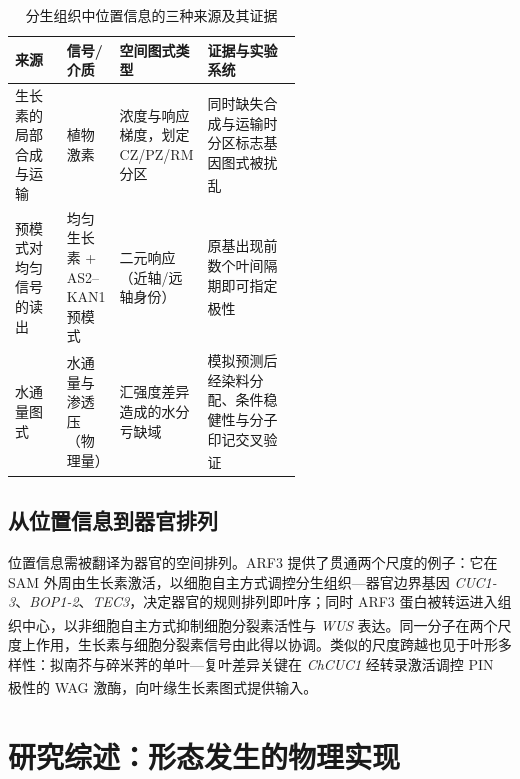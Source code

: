 \documentclass[11pt,a4paper]{ctexart}
\begin{document}
\begin{table}[htbp]
  \centering
  \caption{分生组织中位置信息的三种来源及其证据}
  \label{tab:positional}
  \small
  \renewcommand{\arraystretch}{1.5}
  \setlength{\tabcolsep}{5pt}
  \begin{tabularx}{\linewidth}{@{}>{\raggedright\arraybackslash}p{0.185\linewidth}
                                        >{\raggedright\arraybackslash}p{0.175\linewidth}
                                        >{\raggedright\arraybackslash}p{0.215\linewidth}
                                        >{\raggedright\arraybackslash}X@{}}
    \toprule
    \textbf{来源} & \textbf{信号/介质} & \textbf{空间图式类型} & \textbf{证据与实验系统} \\
    \midrule
    生长素的局部合成与运输 & 植物激素 & 浓度与响应梯度，划定 CZ/PZ/RM 分区
      & 同时缺失合成与运输时分区标志基因图式被扰乱\textsuperscript{\cite{ref2}} \\
    预模式对均匀信号的读出 & 均匀生长素 + AS2--KAN1 预模式 & 二元响应（近轴/远轴身份）
      & 原基出现前数个叶间隔期即可指定极性\textsuperscript{\cite{ref10}} \\
    水通量图式 & 水通量与渗透压（物理量） & 汇强度差异造成的水分亏缺域
      & 模拟预测后经染料分配、条件稳健性与分子印记交叉验证\textsuperscript{\cite{ref11}} \\
    \bottomrule
  \end{tabularx}
\end{table}

\subsection{从位置信息到器官排列}

位置信息需被翻译为器官的空间排列。ARF3 提供了贯通两个尺度的例子：它在 SAM 外周由生长素激活，以细胞自主方式调控分生组织—器官边界基因 \textit{CUC1-3}、\textit{BOP1-2}、\textit{TEC3}，决定器官的规则排列即叶序；同时 ARF3 蛋白被转运进入组织中心，以非细胞自主方式抑制细胞分裂素活性与 \textit{WUS} 表达\textsuperscript{\cite{ref12}}。同一分子在两个尺度上作用，生长素与细胞分裂素信号由此得以协调。类似的尺度跨越也见于叶形多样性：拟南芥与碎米荠的单叶—复叶差异关键在 \textit{ChCUC1} 经转录激活调控 PIN 极性的 WAG 激酶，向叶缘生长素图式提供输入\textsuperscript{\cite{ref13}}。

\section{研究综述：形态发生的物理实现}
\end{document}
